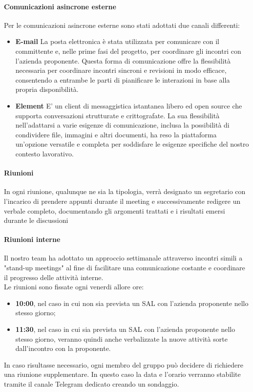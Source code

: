 \paragraph*{Comunicazioni asincrone esterne}
Per le comunicazioni asincrone esterne sono stati adottati due canali differenti:
\begin{itemize}
    \item \textbf{E-mail} La posta elettronica è stata utilizzata per comunicare con il committente e, nelle prime fasi del progetto, per coordinare gli incontri con l'azienda proponente. Questa forma di comunicazione offre la flessibilità necessaria per coordinare incontri sincroni e revisioni in modo efficace, consentendo a entrambe le parti di pianificare le interazioni in base alla propria disponibilità.
    \item \textbf{Element} E' un client di messaggistica istantanea libero ed open source che supporta conversazioni strutturate e crittografate. La sua flessibilità nell'adattarsi a varie esigenze di comunicazione, inclusa la possibilità di condividere file, immagini e altri documenti, ha reso la piattaforma un'opzione versatile e completa per soddisfare le esigenze specifiche del nostro contesto lavorativo.
\end{itemize}

\paragraph*{Riunioni}
In ogni riunione, qualunque ne sia la tipologia, verrà designato un segretario con l'incarico di prendere appunti durante il meeting e successivamente redigere un verbale completo, documentando gli argomenti trattati e i risultati emersi durante le discussioni

\paragraph{Riunioni interne}
Il nostro team ha adottato un approccio settimanale attraverso incontri simili a "stand-up meetings" al fine di facilitare una comunicazione costante e coordinare il progresso delle attività interne.\\

Le riunioni sono fissate ogni venerdi allore ore:
\begin{itemize}
    \item \textbf{10:00}, nel caso in cui non sia prevista un SAL con l'azienda proponente nello stesso giorno;
    \item \textbf{11:30}, nel caso in cui sia prevista un SAL con l'azienda proponente nello stesso giorno, veranno quindi anche verbalizzate la nuove attività sorte dall'incontro con la proponente.
\end{itemize} 
In caso risultasse necessario, ogni membro del gruppo può decidere di richiedere una riunione supplementare. In questo caso la data e l'orario verranno stabilite
tramite il canale Telegram dedicato creando un sondaggio.

